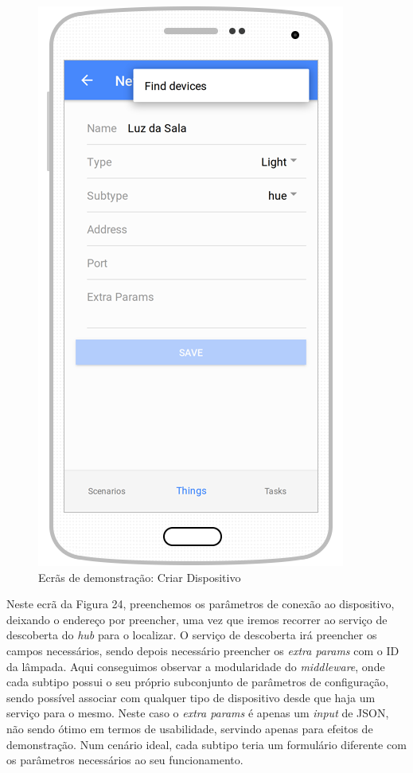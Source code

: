 \begin{figure}[H]
  \centering
        \includegraphics[scale=0.6]{img/demo/new_thing.png}
  \caption{Ecrãs de demonstração: Criar Dispositivo}
\end{figure}

Neste ecrã da Figura 24, preenchemos os parâmetros de conexão ao dispositivo, deixando o endereço por preencher, uma vez que iremos recorrer ao serviço de descoberta do \textit{hub} para o localizar. O serviço de descoberta irá preencher os campos necessários, sendo depois necessário preencher os \textit{extra params} com o ID da lâmpada. Aqui conseguimos observar a modularidade do \textit{middleware}, onde cada subtipo possui o seu próprio subconjunto de parâmetros de configuração, sendo possível associar com qualquer tipo de dispositivo desde que haja um serviço para o mesmo. Neste caso o \textit{extra params} é apenas um \textit{input} de JSON, não sendo ótimo em termos de usabilidade, servindo apenas para efeitos de demonstração. Num cenário ideal, cada subtipo teria um formulário diferente com os parâmetros necessários ao seu funcionamento.

